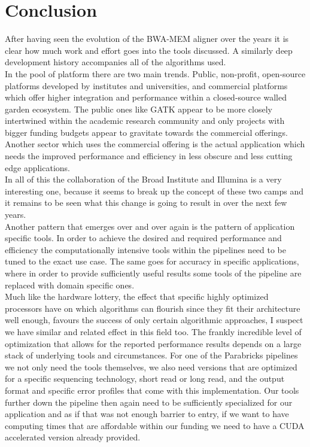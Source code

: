 \documentclass[conference]{IEEEtran}
\begin{document}
\section{Conclusion}
After having seen the evolution of the BWA-MEM aligner over the years it is clear how much work and effort goes into the tools discussed. A similarly deep development history accompanies all of the algorithms used. \\
In the pool of platform there are two main trends. Public, non-profit, open-source platforms developed by institutes and universities, and commercial platforms which offer higher integration and performance within a closed-source walled garden ecosystem. The public ones like GATK appear to be more closely intertwined within the academic research community and only projects with bigger funding budgets appear to gravitate towards the commercial offerings. Another sector which uses the commercial offering is the actual application which needs the improved performance and efficiency in less obscure and less cutting edge applications. \\
In all of this the collaboration of the Broad Institute and Illumina is a very interesting one, because it seems to break up the concept of these two camps and it remains to be seen what this change is going to result in over the next few years. \\
Another pattern that emerges over and over again is the pattern of application specific tools. In order to achieve the desired and required performance and efficiency the computationally intensive tools within the pipelines need to be tuned to the exact use case. The same goes for accuracy in specific applications, where in order to provide sufficiently useful results some tools of the pipeline are replaced with domain specific ones. \\
Much like the hardware lottery, the effect that specific highly optimized processors have on which algorithms can flourish since they fit their architecture well enough, favours the success of only certain algorithmic approaches, I suspect we have similar and related effect in this field too. The frankly incredible level of optimization that allows for the reported performance results depends on a large stack of underlying tools and circumstances. For one of the Parabricks pipelines we not only need the tools themselves, we also need versions that are optimized for a specific sequencing technology, short read or long read, and the output format and specific error profiles that come with this implementation. Our tools further down the pipeline then again need to be sufficiently specialized for our application and as if that was not enough barrier to entry, if we want to have computing times that are affordable within our funding we need to have a CUDA accelerated version already provided. \\
\end{document}
